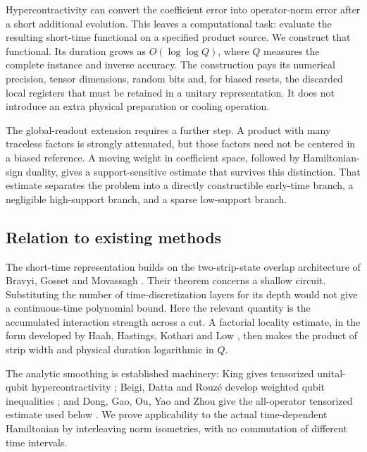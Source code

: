 \documentclass[11pt,reqno]{amsart}
\numberwithin{equation}{section}
\theoremstyle{definition}
\theoremstyle{remark}
\begin{document}
Hypercontractivity can convert the coefficient error into operator-norm error after a short additional evolution. This leaves a computational task: evaluate the resulting short-time functional on a specified product source. We construct that functional. Its duration grows as $O(\log\log Q)$, where $Q$ measures the complete instance and inverse accuracy. The construction pays its numerical precision, tensor dimensions, random bits and, for biased resets, the discarded local registers that must be retained in a unitary representation. It does not introduce an extra physical preparation or cooling operation.

The global-readout extension requires a further step. A product with many traceless factors is strongly attenuated, but those factors need not be centered in a biased reference. A moving weight in coefficient space, followed by Hamiltonian-sign duality, gives a support-sensitive estimate that survives this distinction. That estimate separates the problem into a directly constructible early-time branch, a negligible high-support branch, and a sparse low-support branch.

\subsection{Relation to existing methods}
The short-time representation builds on the two-strip-state overlap architecture of Bravyi, Gosset and Movassagh \cite[Theorem~5]{BGM}. Their theorem concerns a shallow circuit. Substituting the number of time-discretization layers for its depth would not give a continuous-time polynomial bound. Here the relevant quantity is the accumulated interaction strength across a cut. A factorial locality estimate, in the form developed by Haah, Hastings, Kothari and Low \cite[Lemma~5 and Appendix~C.4]{HHKL}, then makes the product of strip width and physical duration logarithmic in $Q$.

The analytic smoothing is established machinery: King gives tensorized unital-qubit hypercontractivity \cite[Theorem~1 and Corollary~2]{King}; Beigi, Datta and Rouz\'e develop weighted qubit inequalities \cite[Theorems~21 and~25]{BDR}; and Dong, Gao, Ou, Yao and Zhou give the all-operator tensorized estimate used below \cite[Theorem~1.1]{DGOYZ}. We prove applicability to the actual time-dependent Hamiltonian by interleaving norm isometries, with no commutation of different time intervals.
\end{document}
